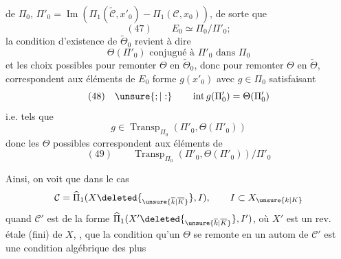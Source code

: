 de $\Pi_0$, $\Pi'_0=\operatorname{Im}(\Pi_1(\widetilde{\mathcal C},x'_0)\mathbin{-}\Pi_1(\mathcal C,x_0))$, de sorte que 
\[
(47)\qquad E_0\simeq\Pi_0/\Pi'_0;
\]
la condition d'existence de $\widetilde{\Theta}_0$ revient à dire
\[
\Theta(\Pi'_0)\text{ conjugué à }\Pi'_0\text{ dans }\Pi_0
\]
et les choix possibles pour remonter $\Theta$ en $\widetilde{\Theta}_0$, donc pour remonter $\Theta$ en $\widetilde{\Theta}$, correspondent aux éléments  de $E_0$   forme $g(x'_0)$ avec $g\in\Pi_0$ satisfaisant
\[
(48)\quad\unsure{;|:}\qquad \operatorname{int}g(\Pi'_0)=\Theta(\Pi'_0)
\]
i.e. tels que
\[
g\in\operatorname{Transp}_{\Pi_0}(\Pi'_0,\Theta(\Pi'_0))
\]
donc les $\Theta$ possibles correspondent aux éléments de
\[
(49)\qquad \operatorname{Transp}_{\Pi_0}(\Pi'_0,\Theta(\Pi'_0))/\Pi'_0
\]

Ainsi, on voit que dans le cas 
\[
\mathcal C=\widehat{\Pi}_1(X\deleted{_{\unsure{\overline{k}|\overline K}}},I),\qquad I\subset X_{\unsure{k|K}}
\]
quand $\mathcal C'$  est de la forme $\widehat{\Pi}_1(X'\deleted{_{\unsure{\overline{k}|\overline K}}},I')$, où $X'$ est un rev. étale (fini) de $X$, , que la condition qu'un  $\Theta$  se remonte en un autom de $\mathcal C'$ est une condition algébrique des plus
